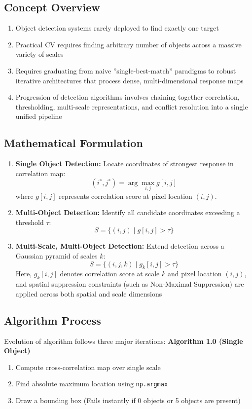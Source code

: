 \documentclass[12pt]{article}
\begin{document}
\subsection{Concept Overview}
\begin{enumerate}
    \item Object detection systems rarely deployed to find exactly one target
    \item Practical CV requires finding arbitrary number of objects across a massive variety of scales
    \item Requires graduating from naive ''single-best-match'' paradigms to robust iterative architectures that process dense, multi-dimensional response maps
    \item Progression of detection algorithms involves chaining together correlation, thresholding, multi-scale representations, and conflict resolution into a single unified pipeline
\end{enumerate}

\subsection{Mathematical Formulation}

\begin{enumerate}
    \item \textbf{Single Object Detection:} Locate coordinates of strongest response in correlation map:
          \[
              (i^*, j^*) = \arg\max_{i,j} g[i,j]
          \]
          where \(g[i,j]\) represents correlation score at pixel location \((i,j)\).

    \item \textbf{Multi-Object Detection:} Identify all candidate coordinates exceeding a threshold \(\tau\):
          \[
              S = \{ (i,j) \mid g[i,j] > \tau \}
          \]

    \item \textbf{Multi-Scale, Multi-Object Detection:} Extend detection across a Gaussian pyramid of scales \(k\):
          \[
              S = \{ (i,j,k) \mid g_k[i,j] > \tau \}
          \]
          Here, \(g_k[i,j]\) denotes correlation score at scale \(k\) and pixel location \((i,j)\), and spatial suppression constraints (such as Non-Maximal Suppression) are applied across both spatial and scale dimensions
\end{enumerate}

\subsection{Algorithm Process}
Evolution of algorithm follows three major iterations: \textbf{Algorithm 1.0 (Single Object)}
\begin{enumerate}
    \item Compute cross-correlation map over single scale
    \item Find absolute maximum location using \texttt{np.argmax}
    \item Draw a bounding box (Fails instantly if 0 objects or 5 objects are present)
\end{enumerate}
\end{document}

